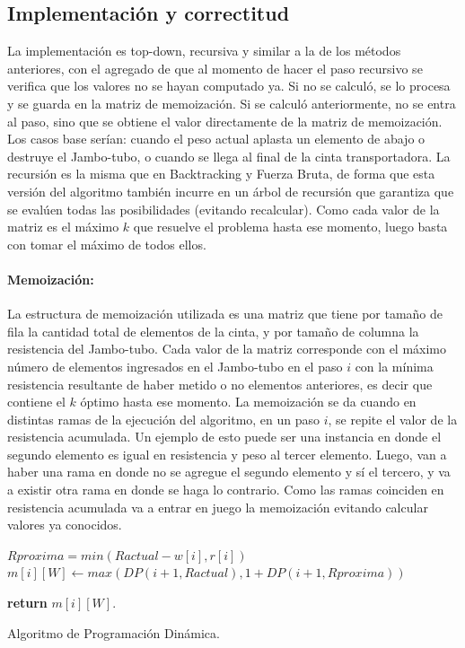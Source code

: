 \documentclass[10pt,a4paper]{article}
\begin{document}
\subsection{Implementación y correctitud}
La implementación es top-down, recursiva y similar a la de los métodos anteriores, con el agregado de que al momento de hacer el paso recursivo se verifica que los valores no se hayan computado ya. Si no se calculó, se lo procesa y se guarda en la matriz de memoización. Si se calculó anteriormente, no se entra al paso, sino que se obtiene el valor directamente de la matriz de memoización. Los casos base serían: cuando el peso actual aplasta un elemento de abajo o destruye el Jambo-tubo, o cuando se llega al final de la cinta transportadora. \newline 
La recursión es la misma que en Backtracking y Fuerza Bruta, de forma que esta versión del algoritmo también incurre en un árbol de recursión que garantiza que se evalúen todas las posibilidades (evitando recalcular). Como cada valor de la matriz es el máximo $k$ que resuelve el problema hasta ese momento, luego basta con tomar el máximo de todos ellos.
\paragraph{Memoización:}
La estructura de memoización utilizada es una matriz que tiene por tamaño de fila la cantidad total de elementos de la cinta, y por tamaño de columna la resistencia del Jambo-tubo. Cada valor de la matriz corresponde con el máximo número de elementos ingresados en el Jambo-tubo en el paso $i$ con la mínima resistencia resultante de haber metido o no elementos anteriores, es decir que contiene el $k$ óptimo hasta ese momento.
La memoización se da cuando en distintas ramas de la ejecución del algoritmo, en un paso $i$, se repite el valor de la resistencia acumulada. Un ejemplo de esto puede ser una instancia en donde el segundo elemento es igual en resistencia y peso al tercer elemento. Luego, van a haber una rama en donde no se agregue el segundo elemento y sí el tercero, y va a existir otra rama en donde se haga lo contrario. Como las ramas coinciden en resistencia acumulada va a entrar en juego la memoización evitando calcular valores ya conocidos.
\begin{algorithm}
	\begin{algorithmic}[1]
		
		\EndIf

		\EndIf
		
			\State $Rproxima = min(Ractual - w[i], r[i])$
			\State $m[i][W] \leftarrow max(DP(i+1, Ractual), 1 + DP(i+1, Rproxima))$
		\EndIf
		
		\State \textbf{return} $m[i][W]$.
		
		\EndFunction
	\end{algorithmic}
	\caption{Algoritmo de Programación Dinámica.}
	\label{alg:dinamica}
\end{algorithm}
\end{document}
